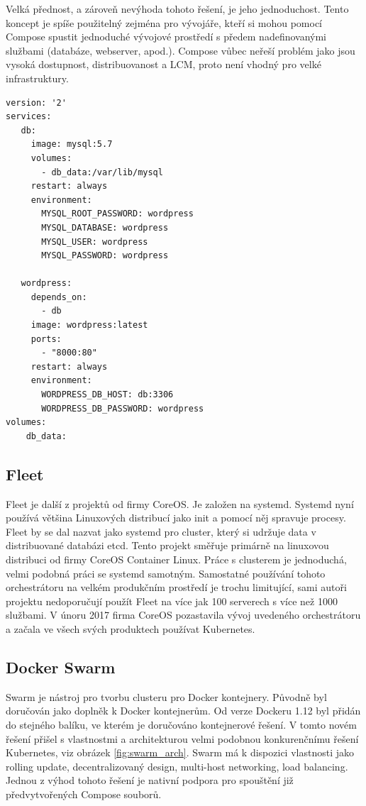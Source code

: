 Velká přednost, a zároveň nevýhoda tohoto řešení, je jeho jednoduchost. Tento koncept je spíše použitelný zejména pro vývojáře, kteří si mohou pomocí Compose spustit jednoduché vývojové prostředí s předem nadefinovanými službami (databáze, webserver, apod.). Compose vůbec neřeší problém jako jsou vysoká dostupnost, distribuovanost a LCM, proto není vhodný pro velké infrastruktury.  

\begin{lstlisting}[caption={Docker Compose pro Wordpress s MySql databází},label= {lst:compose_code}]
version: '2'
services:
   db:
     image: mysql:5.7
     volumes:
       - db_data:/var/lib/mysql
     restart: always
     environment:
       MYSQL_ROOT_PASSWORD: wordpress
       MYSQL_DATABASE: wordpress
       MYSQL_USER: wordpress
       MYSQL_PASSWORD: wordpress

   wordpress:
     depends_on:
       - db
     image: wordpress:latest
     ports:
       - "8000:80"
     restart: always
     environment:
       WORDPRESS_DB_HOST: db:3306
       WORDPRESS_DB_PASSWORD: wordpress
volumes:
    db_data:
\end{lstlisting}

\subsection{Fleet}
Fleet je další z projektů od firmy  CoreOS. Je založen na systemd. Systemd nyní používá většina Linuxových distribucí jako init a pomocí něj spravuje procesy\cite{fleet_systemd}. Fleet by se dal nazvat jako systemd pro cluster, který si udržuje data v distribuované databázi etcd. Tento projekt směřuje primárně na linuxovou distribuci od firmy CoreOS Container Linux. Práce s clusterem je jednoduchá, velmi podobná práci se systemd samotným. Samostatné používání tohoto orchestrátoru na velkém produkčním prostředí je trochu limitující, sami autoři projektu nedoporučují použít Fleet na více jak 100 serverech s více než 1000 službami\cite{fleet_lim}. V únoru 2017 firma CoreOS pozastavila vývoj uvedeného orchestrátoru a začala ve všech svých produktech používat Kubernetes\cite{fleet_end}. 

\subsection{Docker Swarm}
Swarm je nástroj pro tvorbu clusteru pro Docker kontejnery. Původně byl doručován jako doplněk k Docker kontejnerům. Od verze Dockeru 1.12 byl přidán do stejného balíku\cite{docker_1_12}, ve kterém je doručováno kontejnerové řešení. V tomto novém řešení přišel s vlastnostmi a architekturou velmi podobnou konkurenčnímu řešení Kubernetes, viz obrázek \ref{fig:swarm_arch}. Swarm má k dispozici vlastnosti jako rolling update, decentralizovaný design, multi-host networking, load balancing. Jednou z výhod tohoto řešení je nativní podpora pro spouštění již předvytvořených Compose souborů\cite{swarm_compose}. 

